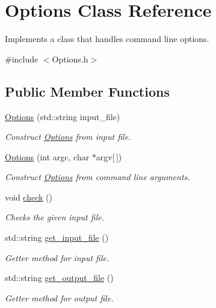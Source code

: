 \hypertarget{classOptions}{}\section{Options Class Reference}
\label{classOptions}


Implements a class that handles command line options.  




{\ttfamily \#include $<$Options.\+h$>$}

\subsection*{Public Member Functions}
\begin{DoxyCompactItemize}
\item 
\hyperlink{classOptions_aa1e7b11260c48cbc4d4c52266c74abf2}{Options} (std\+::string input\+\_\+file)
\begin{DoxyCompactList}\small\item\em Construct \hyperlink{classOptions}{Options} from input file. \end{DoxyCompactList}\item 
\hyperlink{classOptions_ab3a4819d972a234777923d85122bcf37}{Options} (int argc, char $\ast$argv\mbox{[}$\,$\mbox{]})
\begin{DoxyCompactList}\small\item\em Construct \hyperlink{classOptions}{Options} from command line arguments. \end{DoxyCompactList}\item 
void \hyperlink{classOptions_ab8ca4093f5561de9be0405380044c2ea}{check} ()
\begin{DoxyCompactList}\small\item\em Checks the given input file. \end{DoxyCompactList}\item 
std\+::string \hyperlink{classOptions_aaef1783bad5316e5b4639b032e027425}{get\+\_\+input\+\_\+file} ()
\begin{DoxyCompactList}\small\item\em Getter method for input file. \end{DoxyCompactList}\item 
std\+::string \hyperlink{classOptions_a302c26d01b3b3a87aa3482ec15afa85f}{get\+\_\+output\+\_\+file} ()
\begin{DoxyCompactList}\small\item\em Getter method for output file. \end{DoxyCompactList}\end{DoxyCompactItemize}


